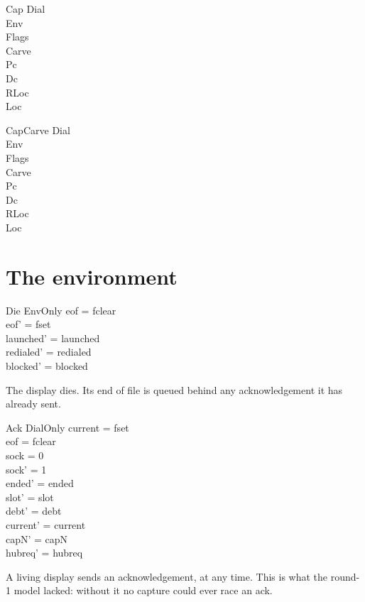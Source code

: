 \documentclass[a4paper,10pt,fleqn]{article}
\begin{document}
\begin{schema}{Cap}
  \Delta Dial \\ \Xi Env \\ \Delta Flags \\ \Xi Carve \\ \Delta Pc \\ \Xi Dc \\
  \Xi RLoc \\ \Xi Loc
\end{schema}

\begin{schema}{CapCarve}
  \Delta Dial \\ \Xi Env \\ \Delta Flags \\ \Delta Carve \\ \Delta Pc \\ \Xi Dc \\
  \Xi RLoc \\ \Xi Loc
\end{schema}

\section{The environment}

\begin{schema}{Die}
  EnvOnly
\where
  eof = fclear \\
  eof' = fset \\
  launched' = launched \\
  redialed' = redialed \\
  blocked' = blocked
\end{schema}

The display dies.  Its end of file is queued behind any acknowledgement it has
already sent.

\begin{schema}{Ack}
  DialOnly
\where
  current = fset \\
  eof = fclear \\
  sock = 0 \\
  sock' = 1 \\
  ended' = ended \\
  slot' = slot \\
  debt' = debt \\
  current' = current \\
  capN' = capN \\
  hubreq' = hubreq
\end{schema}

A living display sends an acknowledgement, at any time.  This is what the round-1
model lacked: without it no capture could ever race an ack.
\end{document}
